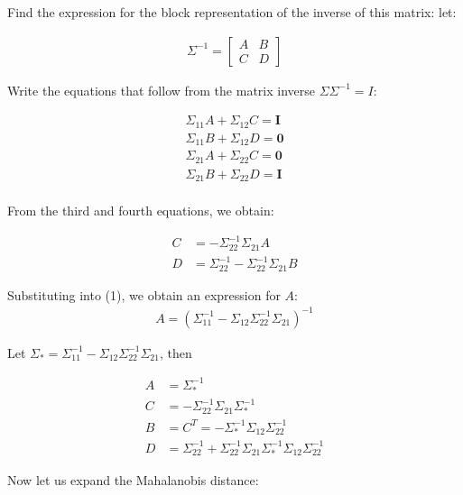 \documentclass[fleqn]{article}
\numberwithin{equation}{section}
\numberwithin{theorem}{section}
\numberwithin{figure}{section}
\numberwithin{lemma}{section}
\numberwithin{corollary}{section}
\begin{document}
Find the expression for the block representation of the inverse of this matrix: let:

\begin{align}
	\Sigma^{-1} = \begin{bmatrix}
		A       & B \\
		C       &D
	\end{bmatrix}
\end{align}

Write the equations that follow from the matrix inverse $\Sigma \Sigma^{-1} = I$:

\begin{align}
	\Sigma_{11}A + \Sigma_{12}C = \mathbf{I}\\
	\Sigma_{11}B + \Sigma_{12}D = \mathbf{0}\\
	\Sigma_{21}A + \Sigma_{22}C = \mathbf{0}\\
	\Sigma_{21}B + \Sigma_{22}D = \mathbf{I}\\
\end{align}
	
From the third and fourth equations, we obtain:

\begin{align}
	C &= -\Sigma_{22}^{-1}\Sigma_{21}A\\
	D &= \Sigma_{22}^{-1} - \Sigma_{22}^{-1} \Sigma_{21}B
\end{align}

Substituting into (1), we obtain an expression for $A$:
\begin{align}
	A = (\Sigma_{11}^{-1} - \Sigma_{12}\Sigma_{22}^{-1}\Sigma_{21})^{-1}
\end{align}

Let $\Sigma_{*} = \Sigma_{11}^{-1} - \Sigma_{12}\Sigma_{22}^{-1}\Sigma_{21}$, then 

\begin{align}
	A &= \Sigma_*^{-1}\\
	C &= -\Sigma_{22}^{-1}\Sigma_{21}\Sigma_*^{-1}\\
	B &= C^{T} = -\Sigma_*^{-1}\Sigma_{12}\Sigma_{22}^{-1}\\
	D &= \Sigma_{22}^{-1} + \Sigma_{22}^{-1} \Sigma_{21}\Sigma_*^{-1}\Sigma_{12}\Sigma_{22}^{-1}
\end{align}

Now let us expand the Mahalanobis distance:
\end{document}
